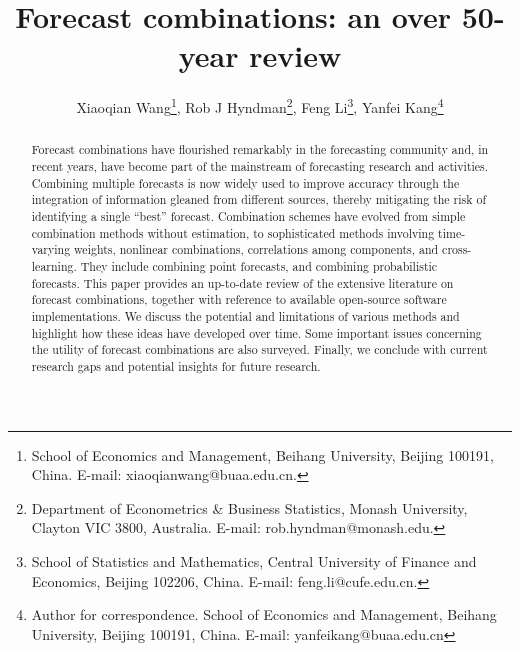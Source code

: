 \documentclass[11pt]{article}
\begin{document}
\def\spacingset#1{\renewcommand{\baselinestretch}%
  {#1}\small\normalsize} \spacingset{1.25}

\title{\bf
  Forecast combinations: an over 50-year review
}

\author{Xiaoqian Wang\footnote{School of Economics and Management, Beihang University,
    Beijing 100191, China. E-mail: xiaoqianwang@buaa.edu.cn.},\quad
  Rob J Hyndman\footnote{Department of Econometrics \& Business Statistics, Monash University,
    Clayton VIC 3800, Australia. E-mail: rob.hyndman@monash.edu.},\quad
  Feng Li\footnote{School of Statistics and Mathematics, Central University of Finance and Economics,
    Beijing 102206, China. E-mail: feng.li@cufe.edu.cn.},\quad
  Yanfei Kang\footnote{Author for correspondence. School of Economics and Management, Beihang University,
    Beijing 100191, China. E-mail: yanfeikang@buaa.edu.cn}}

\maketitle

\bigskip
\begin{abstract}
  Forecast combinations have flourished remarkably in the forecasting community and, in recent years, have become part of the mainstream of forecasting research and activities. Combining multiple forecasts is now widely used to improve accuracy through the integration of information gleaned from different sources, thereby mitigating the risk of identifying a single ``best'' forecast. Combination schemes have evolved from simple combination methods without estimation, to sophisticated methods involving time-varying weights, nonlinear combinations, correlations among components, and cross-learning. They include combining point forecasts, and combining probabilistic forecasts. This paper provides an up-to-date review of the extensive literature on forecast combinations, together with reference to available open-source software implementations. We discuss the potential and limitations of various methods and highlight how these ideas have developed over time. Some important issues concerning the utility of forecast combinations are also surveyed. Finally, we conclude with current research gaps and potential insights for future research.
\end{abstract}
\end{document}
